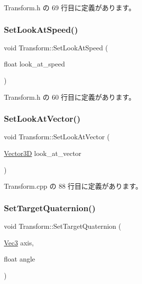  Transform.\+h の 69 行目に定義があります。

\mbox{\label{class_transform_ab6f7342cb4eca555c02a85c999d499dc}} 
\subsubsection{\texorpdfstring{Set\+Look\+At\+Speed()}{SetLookAtSpeed()}}
{\footnotesize\ttfamily void Transform\+::\+Set\+Look\+At\+Speed (\begin{DoxyParamCaption}\item[{float}]{look\+\_\+at\+\_\+speed }\end{DoxyParamCaption})\hspace{0.3cm}{\ttfamily [inline]}}



 Transform.\+h の 60 行目に定義があります。

\mbox{\label{class_transform_a39b78acbdbf3ee98cad0c4e640988745}} 
\subsubsection{\texorpdfstring{Set\+Look\+At\+Vector()}{SetLookAtVector()}}
{\footnotesize\ttfamily void Transform\+::\+Set\+Look\+At\+Vector (\begin{DoxyParamCaption}\item[{\mbox{\hyperlink{class_vector3_d}{Vector3D}}}]{look\+\_\+at\+\_\+vector }\end{DoxyParamCaption})}



 Transform.\+cpp の 88 行目に定義があります。

\mbox{\label{class_transform_ac8cdb5ca9995d9c124f1890d84c92ab4}} 
\subsubsection{\texorpdfstring{Set\+Target\+Quaternion()}{SetTargetQuaternion()}}
{\footnotesize\ttfamily void Transform\+::\+Set\+Target\+Quaternion (\begin{DoxyParamCaption}\item[{\mbox{\hyperlink{_vector3_d_8h_ab16f59e4393f29a01ec8b9bbbabbe65d}{Vec3}}}]{axis,  }\item[{float}]{angle }\end{DoxyParamCaption})}



